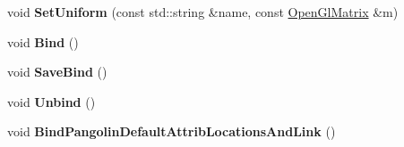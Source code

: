 \begin{DoxyCompactItemize}
\item 
void {\bfseries Set\+Uniform} (const std\+::string \&name, const \hyperlink{structpangolin_1_1_open_gl_matrix}{Open\+Gl\+Matrix} \&m)\hypertarget{classpangolin_1_1_gl_sl_program_a5bca14ef8436d5db56e895632b6527ae}{}\label{classpangolin_1_1_gl_sl_program_a5bca14ef8436d5db56e895632b6527ae}

\item 
void {\bfseries Bind} ()\hypertarget{classpangolin_1_1_gl_sl_program_ad279f3dc5429b3da7d7dc0e516dcce0e}{}\label{classpangolin_1_1_gl_sl_program_ad279f3dc5429b3da7d7dc0e516dcce0e}

\item 
void {\bfseries Save\+Bind} ()\hypertarget{classpangolin_1_1_gl_sl_program_a45242b8df838a436d103504e16efbc81}{}\label{classpangolin_1_1_gl_sl_program_a45242b8df838a436d103504e16efbc81}

\item 
void {\bfseries Unbind} ()\hypertarget{classpangolin_1_1_gl_sl_program_a1e29f0a97f40b680395776414a477370}{}\label{classpangolin_1_1_gl_sl_program_a1e29f0a97f40b680395776414a477370}

\item 
void {\bfseries Bind\+Pangolin\+Default\+Attrib\+Locations\+And\+Link} ()\hypertarget{classpangolin_1_1_gl_sl_program_a6e48637494710a102122e0532abba2dd}{}\label{classpangolin_1_1_gl_sl_program_a6e48637494710a102122e0532abba2dd}

\end{DoxyCompactItemize}
